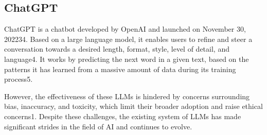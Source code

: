 \subsection{ChatGPT}
ChatGPT is a chatbot developed by OpenAI and launched on November 30, 202234. Based on a large language model, it enables users to refine and steer a conversation towards a desired length, format, style, level of detail, and language4. It works by predicting the next word in a given text, based on the patterns it has learned from a massive amount of data during its training process5.

However, the effectiveness of these LLMs is hindered by concerns surrounding bias, inaccuracy, and toxicity, which limit their broader adoption and raise ethical concerns1. Despite these challenges, the existing system of LLMs has made significant strides in the field of AI and continues to evolve.
